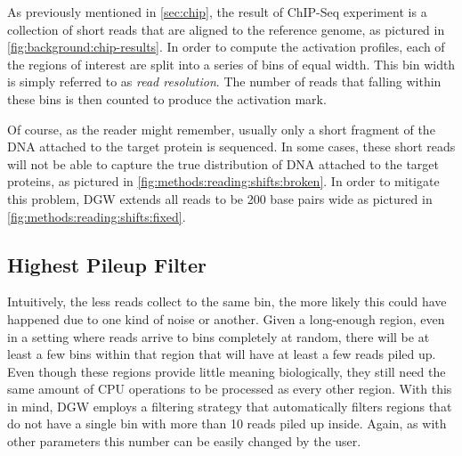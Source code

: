 \documentclass[parskip]{cs4rep}
\begin{document}
As previously mentioned in \autoref{sec:chip}, the result of ChIP-Seq experiment is a collection of short reads that are aligned to the reference genome, as pictured in \autoref{fig:background:chip-results}. In order to compute the activation profiles, each of the regions of interest are split into a series of bins of equal width. This bin width is simply referred to as \emph{read resolution}. The number of reads that falling within these bins is then counted to produce the activation mark.

Of course, as the reader might remember, usually only a short fragment of the DNA attached to the target protein is sequenced. In some cases, these short reads will not be able to capture the true distribution of DNA attached to the target proteins, as pictured in \autoref{fig:methods:reading:shifts:broken}. In order to mitigate this problem, DGW extends all reads to be 200 base pairs wide as pictured in \autoref{fig:methods:reading:shifts:fixed}.

\subsection{Highest Pileup Filter}
Intuitively, the less reads collect to the same bin, the more likely this could have happened due to one kind of noise or another. Given a long-enough region, even in a setting where reads arrive to bins completely at random, there will be at least a few bins within that region that will have at least a few reads piled up. Even though these regions provide little meaning biologically, they still need the same amount of CPU operations to be processed as every other region. With this in mind, DGW employs a filtering strategy that automatically filters regions that do not have a single bin with more than 10 reads piled up inside. Again, as with other parameters this number can be easily changed by the user.
\end{document}

